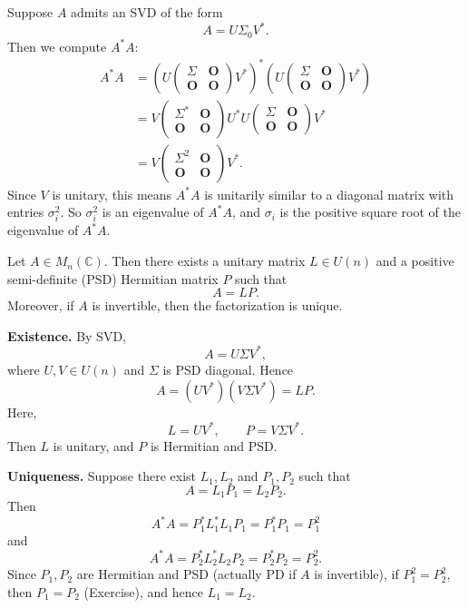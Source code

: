\begin{pfbox}
Suppose $A$ admits an SVD of the form
\[
A=U\Sigma_0V^*.
\]
Then we compute $A^*A$:
\begin{align*}
A^*A
&=
\left(
U
\begin{pmatrix}
\Sigma & \mathbf{O} \\
\mathbf{O} & \mathbf{O}
\end{pmatrix}
V^*
\right)^*
\left(
U
\begin{pmatrix}
\Sigma & \mathbf{O} \\
\mathbf{O} & \mathbf{O}
\end{pmatrix}
V^*
\right) \\
&=
V
\begin{pmatrix}
\Sigma^* & \mathbf{O} \\
\mathbf{O} & \mathbf{O}
\end{pmatrix}
U^*U
\begin{pmatrix}
\Sigma & \mathbf{O} \\
\mathbf{O} & \mathbf{O}
\end{pmatrix}
V^* \\
&=
V
\begin{pmatrix}
\Sigma^2 & \mathbf{O} \\
\mathbf{O} & \mathbf{O}
\end{pmatrix}
V^*.
\end{align*}
Since $V$ is unitary, this means $A^*A$ is unitarily similar to a diagonal matrix
with entries $\sigma_i^2$.
So $\sigma_i^2$ is an eigenvalue of $A^*A$, and $\sigma_i$ is the positive square
root of the eigenvalue of $A^*A$.
\end{pfbox}


\begin{theorem}
Let $A \in M_n(\mathbb{C})$. Then there exists a unitary matrix $L \in U(n)$ and a positive semi-definite (PSD) Hermitian matrix $P$ such that
\[
A=LP.
\]
Moreover, if $A$ is invertible, then the factorization is unique.
\end{theorem}

\begin{pfbox}
\textbf{Existence.}
By SVD,
\[
A=U\Sigma V^*,
\]
where $U,V\in U(n)$ and $\Sigma$ is PSD diagonal. Hence
\[
A=(UV^*)(V\Sigma V^*)=LP.
\]
Here,
\[
L=UV^*,
\qquad
P=V\Sigma V^*.
\]
Then $L$ is unitary, and $P$ is Hermitian and PSD.

\medskip

\textbf{Uniqueness.}
Suppose there exist $L_1,L_2$ and $P_1,P_2$ such that
\[
A=L_1P_1=L_2P_2.
\]
Then
\[
A^*A=P_1^*L_1^*L_1P_1=P_1^*P_1=P_1^2
\]
and
\[
A^*A=P_2^*L_2^*L_2P_2=P_2^*P_2=P_2^2.
\]
Since $P_1,P_2$ are Hermitian and PSD (actually PD if $A$ is invertible), if
$P_1^2=P_2^2$, then $P_1=P_2$ (Exercise), and hence $L_1=L_2$.
\end{pfbox}

